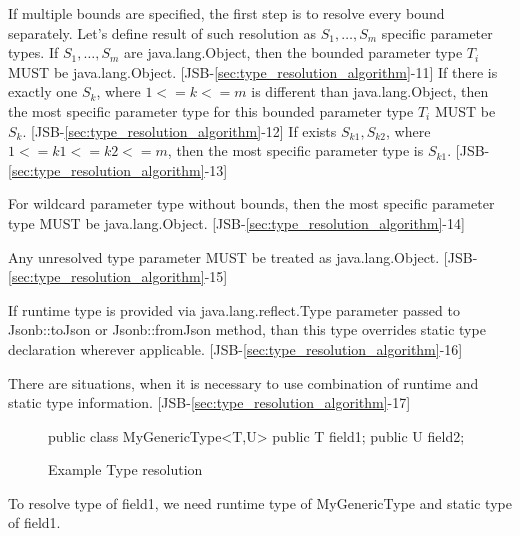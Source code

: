 If multiple bounds are specified, the first step is to resolve every bound separately. Let's define result of such resolution as \(S_1,\dotsc,S_m\) specific parameter types. If \(S_1,\dotsc,S_m\) are java.lang.Object, then the bounded parameter type \(T_i\) MUST be java.lang.Object. [JSB-\ref{sec:type_resolution_algorithm}-11] If there is exactly one \(S_k\), where \(1<=k<=m\) is different than java.lang.Object, then the most specific parameter type for this bounded parameter type \(T_i\) MUST be \(S_k\). [JSB-\ref{sec:type_resolution_algorithm}-12] If exists \(S_{k1},S_{k2}\), where \(1<=k1<=k2<=m\), then the most specific parameter type is \(S_{k1}\). [JSB-\ref{sec:type_resolution_algorithm}-13]

For wildcard parameter type without bounds, then the most specific parameter type MUST be java.lang.Object. [JSB-\ref{sec:type_resolution_algorithm}-14]

Any unresolved type parameter MUST be treated as java.lang.Object. [JSB-\ref{sec:type_resolution_algorithm}-15]

If runtime type is provided via java.lang.reflect.Type parameter passed to Jsonb::toJson or Jsonb::fromJson method, than this type overrides static type declaration wherever applicable. [JSB-\ref{sec:type_resolution_algorithm}-16]

There are situations, when it is necessary to use combination of runtime and static type information. [JSB-\ref{sec:type_resolution_algorithm}-17]

\begin{figure}[hbtp]
\caption{Example Type resolution}
\label{ex1}
\begin{listing}{1}
public class MyGenericType<T,U> {
    public T field1;
    public U field2;
}\end{listing}
\end{figure}

To resolve type of field1, we need runtime type of MyGenericType and static type of field1.
